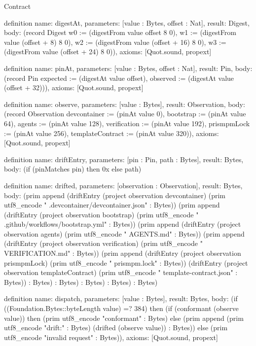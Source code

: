 \begin{lexlean}{Contract}
\begin{semanticmodule}
definition{
  name: digestAt,
  parameters: [value : Bytes, offset : Nat],
  result: Digest,
  body: (record Digest {w0 := (digestFrom value offset 8 0), w1 := (digestFrom value (offset + 8) 8 0), w2 := (digestFrom value (offset + 16) 8 0), w3 := (digestFrom value (offset + 24) 8 0)}),
  axioms: [Quot.sound, propext]
}

definition{
  name: pinAt,
  parameters: [value : Bytes, offset : Nat],
  result: Pin,
  body: (record Pin {expected := (digestAt value offset), observed := (digestAt value (offset + 32))}),
  axioms: [Quot.sound, propext]
}

definition{
  name: observe,
  parameters: [value : Bytes],
  result: Observation,
  body: (record Observation {devcontainer := (pinAt value 0), bootstrap := (pinAt value 64), agents := (pinAt value 128), verification := (pinAt value 192), prismpmLock := (pinAt value 256), templateContract := (pinAt value 320)}),
  axioms: [Quot.sound, propext]
}

definition{
  name: driftEntry,
  parameters: [pin : Pin, path : Bytes],
  result: Bytes,
  body: (if (pinMatches pin) then 0x else path)
}

definition{
  name: drifted,
  parameters: [observation : Observation],
  result: Bytes,
  body: (prim append (driftEntry (project observation devcontainer) (prim utf8_encode " .devcontainer/devcontainer.json" : Bytes)) (prim append (driftEntry (project observation bootstrap) (prim utf8_encode " .github/workflows/bootstrap.yml" : Bytes)) (prim append (driftEntry (project observation agents) (prim utf8_encode " AGENTS.md" : Bytes)) (prim append (driftEntry (project observation verification) (prim utf8_encode " VERIFICATION.md" : Bytes)) (prim append (driftEntry (project observation prismpmLock) (prim utf8_encode " prismpm.lock" : Bytes)) (driftEntry (project observation templateContract) (prim utf8_encode " template-contract.json" : Bytes)) : Bytes) : Bytes) : Bytes) : Bytes) : Bytes)
}

definition{
  name: dispatch,
  parameters: [value : Bytes],
  result: Bytes,
  body: (if ((Foundation.Bytes::byteLength value) =? 384) then (if (conformant (observe value)) then (prim utf8_encode "conformant" : Bytes) else (prim append (prim utf8_encode "drift:" : Bytes) (drifted (observe value)) : Bytes)) else (prim utf8_encode "invalid request" : Bytes)),
  axioms: [Quot.sound, propext]
}


\end{semanticmodule}
\end{lexlean}
